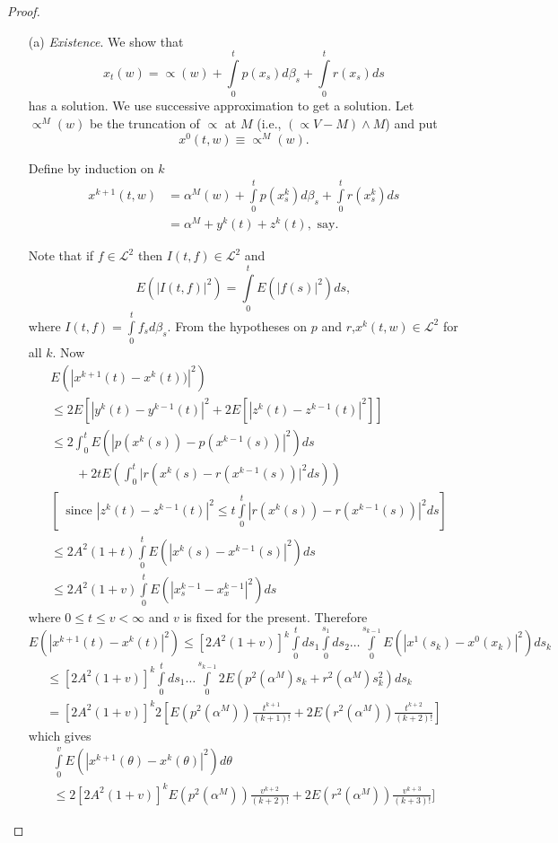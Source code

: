 \begin{proof} %
\begin{itemize}
\item[(a)] {\em Existence}. We show that 
$$
x_t (w) = \propto (w) + \int\limits^t _0 p (x_s) d \beta _s
+\int\limits^t _0 r (x_s) ds  
$$
has a solution. We use successive approximation to get a
solution. Let $\propto ^M (w)$ be the truncation of $\propto$ at $M$
(i.e., $( \propto V - M ) \wedge M$) and put  
$$
x^0 (t, w ) \equiv \propto ^M (w). 
$$
  
Define by induction on $k$
\begin{align*}  
x^{k +1} (t, w) &= \alpha^M (w) + \int\limits^t_0 p (x^k_s) d
  \beta_s + \int\limits^t_0 r(x^k_s) ds\\
& = \alpha^M + y^k (t) +
  z^k (t), \text{\ say.} 
\end{align*}

Note that if $f \in \mathscr{L}^2$ then $I (t, f ) \in
  \mathscr{L}^2$ and 
$$
E (| I (t, f)|^2) = \int\limits^t_0 E (| f  (s)|^2) ds,
$$ 
where $I (t, f) = \int\limits^t _0 f_s d \beta
  _s$. From the hypotheses on $p$ and $r$,\break $x^k (t, w) \in
  \mathscr{L}^2$ for all $k$. Now  
  \begin{align*}
&    E (| x^{ k +1} (t) - x^k (t))|^2 )\\
& \leq 2 E \left[ | y^k (t) -y^{k
        - 1} (t)|^2 + 2E \left[ |z^k (t)-z^{k-1} (t)|^2\right] \right] \\ 
&    \leq 2 \int_0^t E(|p (x^k (s)) - p(x^{k-1}(s))|^2) ds\\
&\qquad + 2t
    E\left(\int_0^t |r (x^k (s) - r (x^{k-1}(s))|^2 ds )\right)\\ 
&    \left[\ \text{ since } | z^k (t) - z^{ k -1} (t) |^2 \leq t
      \int\limits^t _0 | r (x^k (s) ) -r (x ^{ k -1} (s)) |^2 ds
      \right] \\ 
&    \leq 2A^2 (1 + t)\int\limits^t _0 E (| x^k (s) - x^{ k - 1} (s)
    |^2 ) ds\\
& \leq 2A^2 (1 + v) \int\limits^t _0 E (| x^{k - 1}_s -
    x^{k-1}_x | ^2 ) ds  
  \end{align*}\pageoriginale
where $0 \leq t \leq v < \infty$ and $v$ is fixed for the
present. Therefore $E(| x^{k+1} (t) - x^k (t)|^2 ) \leq [ 2A^2 (1
 + v)]^k \int\limits^t_0 ds_1 \int\limits^{s_{1}}_{ 0} ds_2
  \ldots \int\limits^{s_{ k - 1}}_{ 0}E(|
  x^1 (s_k) - x^0 (x_k) |^2 ) ds_k$ 
  \begin{multline*}
     \leq [ 2 A^2 (1 + v)]^k \int\limits^t_0 ds_1 \ldots
    \int\limits^{s_{k-1}}_0 2 E (p^2 (\alpha^M) s_k + r^2
    (\alpha^M) s^2_k) ds_k\\ 
    = [2A^2 (1 + v)]^k 2 \left[ E ( p^2 (\alpha^M))
      \frac{t^{k+1}}{(k+1)!}+ 2E (r^2 (\alpha^M))\frac{t^{k +2}}{(k +
        2)!}\right] 
  \end{multline*}
  which gives 
  \begin{multline*}
    \int\limits^v_0 E (| x^{k+1} (\theta) - x^k(\theta) |^2 )d \theta \\
    \leq 2
    \left[2A^2 (1 + v)\right]^k E (p^2 (\alpha^M)) \frac{v^{k +2}}{(k + 2)!} +
      2 E (r^2(\alpha^M)) \frac{v^{k+3}}{(k+3)!}] 
  \end{multline*}


\end{itemize}
\end{proof}
